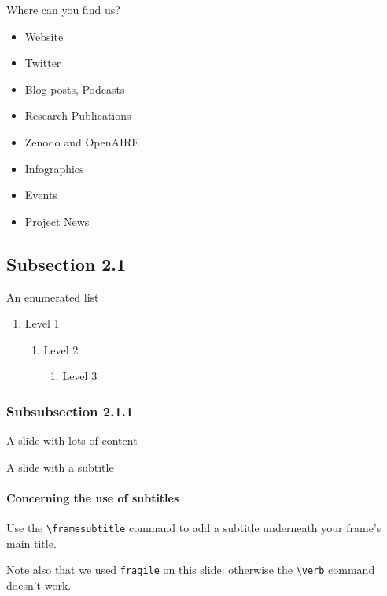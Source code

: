 \documentclass[12pt, t]{beamer}
\begin{document}
\begin{frame}{Where can you find us?}
    \begin{itemize}
        \item Website
		\item Twitter
		\item Blog posts, Podcasts
		\item Research Publications
		\item Zenodo and OpenAIRE
		\item Infographics
		\item Events
		\item Project News
    \end{itemize}
\end{frame}



\subsection{Subsection 2.1}

\begin{frame}{An enumerated list}
    \begin{enumerate}
        \item Level 1
        \begin{enumerate}
            \item Level 2
            \begin{enumerate}
                \item Level 3
            \end{enumerate}
        \end{enumerate}
    \end{enumerate}
\end{frame}



\subsubsection{Subsubsection 2.1.1}

\begin{frame}{A slide with lots of content}
    \lipsum[2]
\end{frame}

\begin{frame}[fragile]{A slide with a subtitle}
  \framesubtitle{Concerning the use of subtitles}

  Use the \verb#\framesubtitle# command to add a subtitle
  underneath your frame's main title.

  \vfill

  Note also that we used \verb#fragile# on this slide: otherwise
  the \verb#\verb# command doesn't work.
\end{frame}
\end{document}
